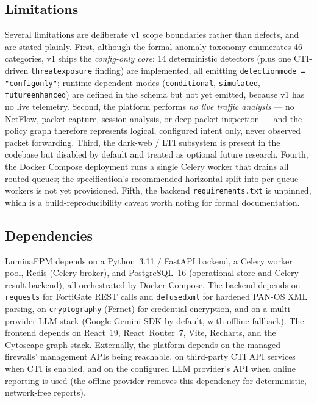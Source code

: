 \documentclass[12pt,a4paper]{report}
\renewcommand{\_}{\textunderscore\allowbreak}
\begin{document}
\subsection{Limitations}
\label{sec:ch3-limitations}
Several limitations are deliberate v1 scope boundaries rather than defects, and are stated plainly. First, although the formal anomaly taxonomy enumerates 46 categories, v1 ships the \emph{config-only core}: 14 deterministic detectors (plus one CTI-driven \texttt{threat\_exposure} finding) are implemented, all emitting \texttt{detection\_mode = "config\_only"}; runtime-dependent modes (\texttt{conditional}, \texttt{simulated}, \texttt{future\_enhanced}) are defined in the schema but not yet emitted, because v1 has no live telemetry. Second, the platform performs \emph{no live traffic analysis} — no NetFlow, packet capture, session analysis, or deep packet inspection — and the policy graph therefore represents logical, configured intent only, never observed packet forwarding. Third, the dark-web / LTI subsystem is present in the codebase but disabled by default and treated as optional future research. Fourth, the Docker Compose deployment runs a single Celery worker that drains all routed queues; the specification's recommended horizontal split into per-queue workers is not yet provisioned. Fifth, the backend \texttt{requirements.txt} is unpinned, which is a build-reproducibility caveat worth noting for formal documentation.

\subsection{Dependencies}
\label{sec:ch3-dependencies}
LuminaFPM depends on a Python~3.11 / FastAPI backend, a Celery worker pool, Redis (Celery broker), and PostgreSQL~16 (operational store and Celery result backend), all orchestrated by Docker Compose. The backend depends on \texttt{requests} for FortiGate REST calls and \texttt{defusedxml} for hardened PAN-OS XML parsing, on \texttt{cryptography} (Fernet) for credential encryption, and on a multi-provider LLM stack (Google Gemini SDK by default, with offline fallback). The frontend depends on React~19, React~Router~7, Vite, Recharts, and the Cytoscape graph stack. Externally, the platform depends on the managed firewalls' management APIs being reachable, on third-party CTI API services when CTI is enabled, and on the configured LLM provider's API when online reporting is used (the offline provider removes this dependency for deterministic, network-free reports).
\end{document}
